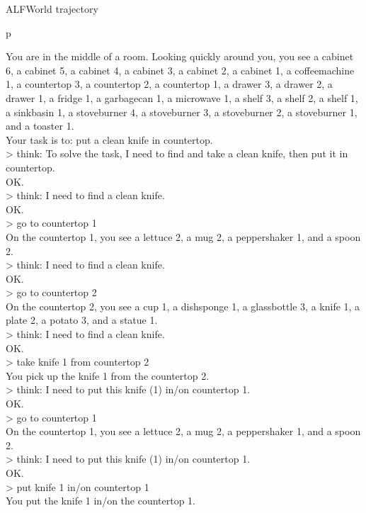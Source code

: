 \begin{table}[H]
\scriptsize
\begin{minipage}{0.9\linewidth}
\modelim{} ALFWorld trajectory
\centering
\ttfamily
\begin{tabular}{p\linewidth}
\midrule

You are in the middle of a room. Looking quickly around you, you see a cabinet 6, a cabinet 5, a cabinet 4, a cabinet 3, a cabinet 2, a cabinet 1, a coffeemachine 1, a countertop 3, a countertop 2, a countertop 1, a drawer 3, a drawer 2, a drawer 1, a fridge 1, a garbagecan 1, a microwave 1, a shelf 3, a shelf 2, a shelf 1, a sinkbasin 1, a stoveburner 4, a stoveburner 3, a stoveburner 2, a stoveburner 1, and a toaster 1. \\
Your task is to: put a clean knife in countertop. \\
> think: To solve the task, I need to find and take a clean knife, then put it in countertop. \\
OK. \\
> think: I need to find a clean knife. \\
OK. \\
> go to countertop 1 \\
On the countertop 1, you see a lettuce 2, a mug 2, a peppershaker 1, and a spoon 2. \\
> think: I need to find a clean knife. \\
OK. \\
> go to countertop 2 \\
On the countertop 2, you see a cup 1, a dishsponge 1, a glassbottle 3, a knife 1, a plate 2, a potato 3, and a statue 1. \\
> think: I need to find a clean knife. \\
OK. \\
> take knife 1 from countertop 2 \\
You pick up the knife 1 from the countertop 2. \\
> think: I need to put this knife (1) in/on countertop 1. \\
OK. \\
> go to countertop 1 \\
On the countertop 1, you see a lettuce 2, a mug 2, a peppershaker 1, and a spoon 2. \\
> think: I need to put this knife (1) in/on countertop 1. \\
OK. \\
> put knife 1 in/on countertop 1 \\
You put the knife 1 in/on the countertop 1. \\

\end{tabular}
\end{minipage}
\end{table}
